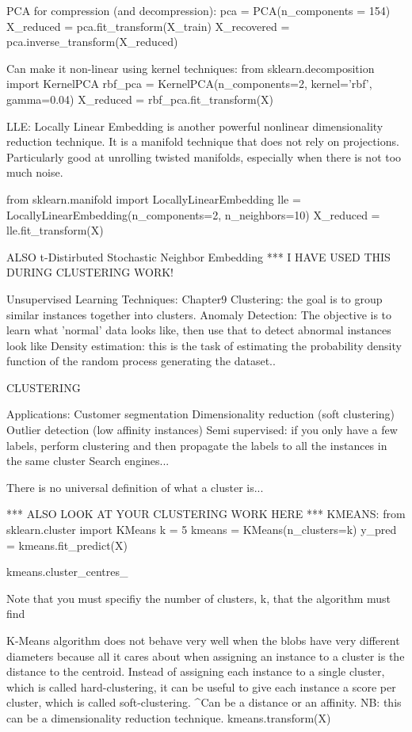 PCA for compression (and decompression):
pca = PCA(n_components = 154)
X_reduced = pca.fit_transform(X_train)
X_recovered = pca.inverse_transform(X_reduced)

Can make it non-linear using kernel techniques:
from sklearn.decomposition import KernelPCA
rbf_pca = KernelPCA(n_components=2, kernel='rbf', gamma=0.04)
X_reduced = rbf_pca.fit_transform(X)

LLE: Locally Linear Embedding
is another powerful nonlinear dimensionality reduction technique.
It is a manifold technique that does not rely on projections.
Particularly good at unrolling twisted manifolds, especially when there is not too much noise.

from sklearn.manifold import LocallyLinearEmbedding
lle = LocallyLinearEmbedding(n_components=2, n_neighbors=10)
X_reduced = lle.fit_transform(X)

ALSO t-Distirbuted Stochastic Neighbor Embedding
*** I HAVE USED THIS DURING CLUSTERING WORK!





Unsupervised Learning Techniques: Chapter9
Clustering: the goal is to group similar instances together into clusters.
Anomaly Detection: The objective is to learn what 'normal' data looks like,
then use that to detect abnormal instances look like
Density estimation: this is the task of estimating the probability density function of the random process generating the dataset..

CLUSTERING

Applications:
Customer segmentation
Dimensionality reduction (soft clustering)
Outlier detection (low affinity instances)
Semi supervised: if you only have a few labels, perform clustering and then propagate the labels to all the instances in the same cluster
Search engines...

There is no universal definition of what a cluster is...

*** ALSO LOOK AT YOUR CLUSTERING WORK HERE ***
KMEANS:
from sklearn.cluster import KMeans
k = 5
kmeans = KMeans(n_clusters=k)
y_pred = kmeans.fit_predict(X)

kmeans.cluster_centres_

Note that you must specifiy the number of clusters, k, that the algorithm must find

K-Means algorithm does not behave very well when the blobs have very different diameters because all it cares about
when assigning an instance to a cluster is the distance to the centroid.
Instead of assigning each instance to a single cluster, which is called hard-clustering,
it can be useful to give each instance a score per cluster, which is called soft-clustering.
^Can be a distance or an affinity. NB: this can be a dimensionality reduction technique.
kmeans.transform(X)

